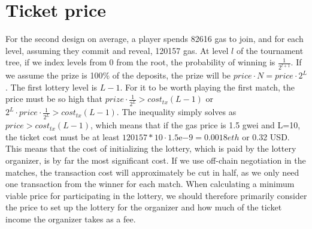 \section{Ticket price}
\label{sec:ticket-price}

For the second design on average, a player spends 82616 gas to join, and for each level, assuming they commit and reveal, 120157 gas. At level $l$ of the tournament tree, if we index levels from 0 from the root, the probability of winning is $\frac{1}{2^{l+1}}$. If we assume the prize is 100\% of the deposits, the prize will be $price \cdot N=price \cdot 2^L$. The first lottery level is $L-1$. For it to be worth playing the first match, the price must be so high that $prize \cdot \frac{1}{2^L} > cost_{tx}(L-1)$ or $2^L \cdot price \cdot \frac{1}{2^L} > cost_{tx}(L-1)$. The inequality simply solves as $price > cost_{tx}(L-1)$, which means that if the gas price is 1.5 gwei and L=10, the ticket cost must be at least $120157 * 10 \cdot 1.5 \mathrm{e}{-9}=0.0018 eth$ or 0.32 USD. 
This means that the cost of initializing the lottery, which is paid by the lottery organizer, is by far the most significant cost. If we use off-chain negotiation in the matches, the transaction cost will approximately be cut in half, as we only need one transaction from the winner for each match. When calculating a minimum viable price for participating in the lottery, we should therefore primarily consider the price to set up the lottery for the organizer and how much of the ticket income the organizer takes as a fee.
